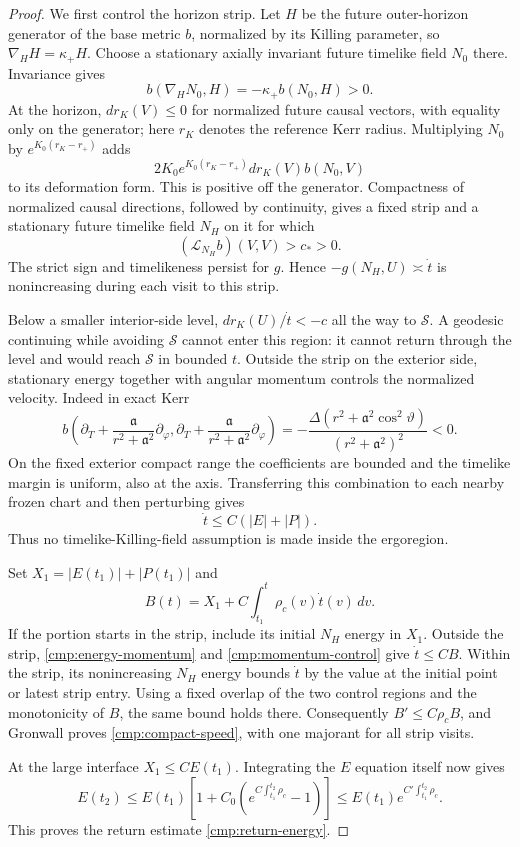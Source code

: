 \begin{proof}
We first control the horizon strip. Let $H$ be the future outer-horizon
generator of the base metric $b$, normalized by its Killing parameter,
so $\nabla_HH=\kappa_+H$. Choose a stationary axially invariant future
timelike field $N_0$ there. Invariance gives
\[
 b(\nabla_HN_0,H)=-\kappa_+b(N_0,H)>0.
\]
At the horizon, $dr_K(V)\leq0$ for normalized future causal vectors,
with equality only on the generator; here $r_K$ denotes the reference
Kerr radius. Multiplying $N_0$ by $e^{K_0(r_K-r_+)}$ adds
\[
 2K_0e^{K_0(r_K-r_+)}dr_K(V)b(N_0,V)
\]
to its deformation form. This is positive off the generator. Compactness
of normalized causal directions, followed by continuity, gives a fixed
strip and a stationary future timelike field $N_H$ on it for which
\begin{equation}\label{cmp:redshift}
 (\mathcal L_{N_H}b)(V,V)>c_*>0.
\end{equation}
The strict sign and timelikeness persist for $g$. Hence
$-g(N_H,U)\asymp\dot t$ is nonincreasing during each visit to this
strip.

Below a smaller interior-side level, $dr_K(U)/\dot t<-c$ all the way
to $\mathcal S$. A geodesic continuing while avoiding $\mathcal S$
cannot enter this region: it cannot return through the level and would
reach $\mathcal S$ in bounded $t$. Outside the strip on the exterior
side, stationary energy together with angular momentum controls the
normalized velocity. Indeed in exact Kerr
\[
 b\left(\partial_T+
       \frac{\mathfrak a}{r^2+\mathfrak a^2}\partial_\varphi,
       \partial_T+
       \frac{\mathfrak a}{r^2+\mathfrak a^2}\partial_\varphi\right)
 =-\frac{\Delta(r^2+\mathfrak a^2\cos^2\vartheta)}
          {(r^2+\mathfrak a^2)^2}<0.
\]
On the fixed exterior compact range the coefficients are bounded and
the timelike margin is uniform, also at the axis. Transferring this
combination to each nearby frozen chart and then perturbing gives
\begin{equation}\label{cmp:momentum-control}
 \dot t\leq C(|E|+|P|).
\end{equation}
Thus no timelike-Killing-field assumption is made inside the ergoregion.

Set $X_1=|E(t_1)|+|P(t_1)|$ and
\[
 B(t)=X_1+C\int_{t_1}^t\rho_c(v)\dot t(v)\,dv.
\]
If the portion starts in the strip, include its initial $N_H$ energy
in $X_1$. Outside the strip, \eqref{cmp:energy-momentum} and
\eqref{cmp:momentum-control} give $\dot t\leq CB$. Within the strip,
its nonincreasing $N_H$ energy bounds $\dot t$ by the value at the
initial point or latest strip entry. Using a fixed overlap of the two
control regions and the monotonicity of $B$, the same bound holds
there. Consequently $B'\leq C\rho_c B$, and Gronwall proves
\eqref{cmp:compact-speed}, with one majorant for all strip visits.

At the large interface $X_1\leq CE(t_1)$. Integrating the $E$ equation
itself now gives
\[
 E(t_2)\leq E(t_1)
   \left[1+C_0\left(e^{C\int_{t_1}^{t_2}\rho_c}-1\right)\right]
 \leq E(t_1)e^{C'\int_{t_1}^{t_2}\rho_c}.
\]
This proves the return estimate \eqref{cmp:return-energy}.
\end{proof}

